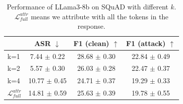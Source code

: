 \documentclass[11pt]{article}
\begin{document}
\begin{table}[t]
\centering
\small

 \begin{minipage}[b]{\linewidth}
\caption{
Transferring the mask from feature attribution between code-based and text-based injection. Learning a mask from prompt with code/text injections and apply on data with text/code injections. 
}
\label{tb:transfer}
\end{minipage}

\end{table}



\begin{table}[t]
\centering
\small
\begin{tabular}{l | c c c}
\toprule
  & \textbf{ASR} $\downarrow$ & \textbf{F1 (clean)} $\uparrow$ & \textbf{F1 (attack)} $\uparrow$ \\
\midrule
{k=1}    & 7.44 $\pm$ 0.22 & 28.68 $\pm$ 0.30 & 22.84 $\pm$ 0.49 \\
{k=2}  & 5.57 $\pm$ 0.30 & 26.03 $\pm$ 0.28 & 22.47 $\pm$ 0.37 \\
{k=4}    & 10.77 $\pm$ 0.45& 24.71 $\pm$ 0.37 & 19.29 $\pm$ 0.33 \\
$\mathcal L^{attr}_{full}$     & 14.81 $\pm$ 0.59 & 25.63 $\pm$ 0.39 & 19.78 $\pm$  0.55\\
\bottomrule
\end{tabular}
\caption{Performance of LLama3-8b on SQuAD with different  $k$. $\mathcal L^{attr}_{full}$ means we attribute with all the tokens in the response.}
\label{tb:lr}
\vspace{-1em}
\end{table}
\end{document}
